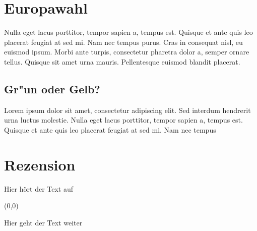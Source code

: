 \documentclass{freistuz}
\begin{document}
\section{Europawahl}
\begin{multicols}{2}
Nulla eget lacus porttitor, tempor sapien a, tempus est. Quisque et ante quis leo placerat feugiat at sed mi. Nam nec tempus purus. Cras in consequat nisl, eu euismod ipsum. Morbi ante turpis, consectetur pharetra dolor a, semper ornare tellus. Quisque sit amet urna mauris. Pellentesque euismod blandit placerat.
\subsection{Gr"un oder Gelb?}
Lorem ipsum dolor sit amet, consectetur adipiscing elit. Sed interdum hendrerit urna luctus molestie. Nulla eget lacus porttitor, tempor sapien a, tempus est. Quisque et ante quis leo placerat feugiat at sed mi. Nam nec tempus
\end{multicols}


\section{Rezension}
\begin{multicols}{2}
\blindtext[3]
\blindtext[2] Hier hört der Text auf\\
\end{multicols}
\newpage

\begin{textblock}{1}(0,0)
\vspace{-2.2mm}
\end{textblock}
\newpage\quad\newpage
\begin{multicols}{2}
\newpage\newpage
Hier geht der Text weiter
\blindtext[3]
\end{multicols}
\end{document}
